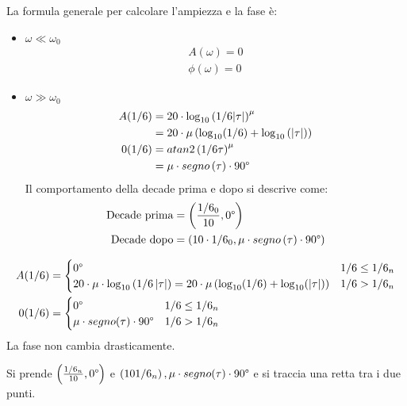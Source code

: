 \documentclass[a4paper]{article}
\begin{document}
\vspace{1em}
\noindent
La formula generale per calcolare l'ampiezza e la fase è:
\begin{itemize}
  \item \( \omega \ll \omega_0 \) 
    \[
    \begin{aligned}
      A(\omega) = 0\\
      \phi(\omega) = 0
    \end{aligned}
    \] 
  \item \( \omega \gg \omega_0 \) 
    \[
    \begin{aligned}
      A(1/6) &= 20 \cdot \log_{10} \left( 1/6 |\tau| \right)^{\mu}\\
                &= 20 \cdot \mu \left( \log_{10} (1/6) + \log_{10} \left( \left| \tau \right|  \right)  \right) \\
      0(1/6) &= atan2 \left( 1/6 \tau \right)^{\mu}\\
                   &= \mu \cdot segno \left( \tau \right) \cdot 90\degree
    \end{aligned}
    \] 
    Il comportamento della decade prima e dopo si descrive come:
    \[
      \begin{aligned}
        \text{Decade prima} &= \left( \frac{1/6_0}{10}, 0\degree \right) \\
        \text{Decade dopo} &= \left( 10 \cdot 1/6_0, \mu \cdot segno \left( \tau \right) \cdot 90\degree \right)
      \end{aligned}
    \] 
\end{itemize}

\begin{definition}
  \[
    \begin{aligned}
      A(1/6) &= \begin{cases}
        0\degree & 1/6 \le 1/6_n\\
        20 \cdot \mu \cdot \log_{10} \left( 1/6 \left| \tau \right|  \right) =
        20 \cdot \mu \left( \log_{10}(1/6) + \log_{10}(|\tau|) \right)  & 1/6 > 1/6_n
      \end{cases}\\
        0(1/6) &= \begin{cases}
          0\degree & 1/6 \le 1/6_n\\
          \mu \cdot segno(\tau) \cdot 90\degree & 1/6 > 1/6_n
        \end{cases}
        \end{aligned}
      \] 
      La fase non cambia drasticamente.

      Si prende \( \left( \frac{1/6_n}{10}, 0\degree \right)  \) e \( \left( 10 1/6_n \right), 
      \mu \cdot segno(\tau) \cdot 90\degree\) e si traccia una retta tra i due punti.
\end{definition}
\end{document}
